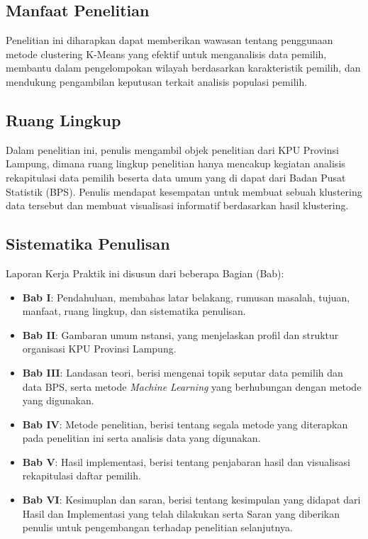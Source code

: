 \subsection{Manfaat Penelitian}
Penelitian ini diharapkan dapat memberikan wawasan tentang penggunaan metode clustering K-Means yang efektif untuk menganalisis data pemilih, membantu dalam pengelompokan wilayah berdasarkan karakteristik pemilih, dan mendukung pengambilan keputusan terkait analisis populasi pemilih.

\subsection{Ruang Lingkup}
Dalam penelitian ini, penulis mengambil objek penelitian dari KPU Provinsi Lampung, dimana ruang lingkup penelitian hanya mencakup kegiatan analisis rekapitulasi data pemilih beserta data umum yang di dapat dari Badan Pusat Statistik (BPS). Penulis mendapat kesempatan untuk membuat sebuah klustering data tersebut dan membuat visualisasi informatif berdasarkan hasil klustering.

\subsection{Sistematika Penulisan}
Laporan Kerja Praktik ini disusun dari beberapa Bagian (Bab):
\begin{itemize}
    \item \textbf{Bab I}: Pendahuluan, membahas latar belakang, rumusan masalah, tujuan, manfaat, ruang lingkup, dan sistematika penulisan.
    \item \textbf{Bab II}: Gambaran umum nstansi, yang menjelaskan profil dan struktur organisasi KPU Provinsi Lampung.
    \item \textbf{Bab III}: Landasan teori, berisi mengenai topik seputar data pemilih dan data BPS, serta metode \textit{Machine Learning} yang berhubungan dengan metode yang digunakan.
    \item \textbf{Bab IV}: Metode penelitian, berisi tentang segala metode yang diterapkan pada penelitian ini serta analisis data yang digunakan.
    \item \textbf{Bab V}: Hasil implementasi, berisi tentang penjabaran hasil dan visualisasi rekapitulasi daftar pemilih.
    \item \textbf{Bab VI}: Kesimuplan dan saran, berisi tentang kesimpulan yang didapat dari Hasil dan Implementasi yang telah dilakukan serta Saran yang diberikan penulis untuk pengembangan terhadap penelitian selanjutnya.
\end{itemize}

\newpage